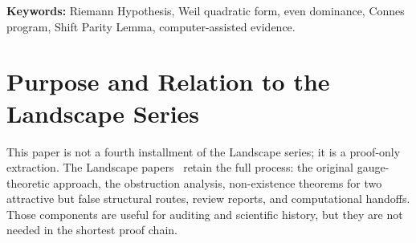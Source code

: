\documentclass[11pt,a4paper]{article}
\theoremstyle{remark}
\theoremstyle{plain}
\begin{document}
\begin{abstract}
\medskip\noindent
\textbf{v1.5 reformulation (14 May 2026, evening).}  Earlier drafts
expressed the Weil quadratic form on $L^2([-L,L])$ with a real
cosine/sine basis and identified the even/odd parity sectors with
$t\mapsto -t$.  In this formulation, the cosine and sine sectors
share identical symmetric-shift auto-overlaps at every frequency
$k\pi/L$, producing
$\sigma(A_\lambda^+) = \sigma(A_\lambda^-) \cup \{\mu^+_0\}$ exactly
and thus contradicting even dominance.  A comparison against
Connes--van Suijlekom's proven form \cite{ConnesvS2025} shows that
the correct setting is $L^2([0,L])$ with the complex exponential
basis $U_n=L^{-1/2}\exp(2\pi inx/L)$ and parity defined via
$U_n\leftrightarrow U_{-n}$.  In this setting the matrix of the
Weil quadratic form has cosine- and sine-sector diagonals
$D_n\mp S_n$, where $S_n=(\pi n)^{-1}\int_0^L\sin(2\pi ny/L)\,dD(y)$
captures the genuine asymmetry between the two parity sectors.
Numerically $S_n>0$ for the Weil distribution (e.g.,
$S_1\approx 8.63$ at $\lambda=1000$, giving cosine diagonal
$\approx 3.26$ versus sine diagonal $\approx 20.52$), so even
dominance is structurally present in the corrected form.  Section~2
has been rewritten accordingly; downstream sections retain their
legacy structure and require parallel adaptation.

The excluded gauge, total-positivity, and universal-commutator routes
are not used here and are deferred to the Landscape series.
\end{abstract}

\noindent\textbf{Keywords:} Riemann Hypothesis, Weil quadratic form, even dominance, Connes program, Shift Parity Lemma, computer-assisted evidence.

\newpage
\section{Purpose and Relation to the Landscape Series}

This paper is not a fourth installment of the Landscape series; it is a
proof-only extraction. The Landscape papers~\cite{GeigerLandscapeI,GeigerLandscapeII,GeigerLandscapeIII}
retain the full process: the original gauge-theoretic approach, the obstruction
analysis, non-existence theorems for two attractive but false structural routes,
review reports, and computational handoffs. Those components are useful for
auditing and scientific history, but they are not needed in the shortest proof
chain.
\end{document}
